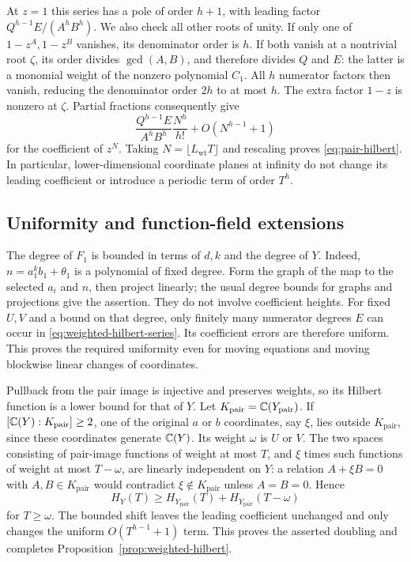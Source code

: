 At \(z=1\) this series has a pole of order \(h+1\), with leading
factor \(Q^{h-1}E/(A^hB^h)\).
We also check all other roots of unity.  If only one of
\(1-z^A,1-z^B\) vanishes, its denominator order is \(h\).
If both vanish at a nontrivial root \(\zeta\), its order divides
\(\gcd(A,B)\), and therefore divides \(Q\) and \(E\): the latter
is a monomial weight of the nonzero polynomial \(C_1\).
All \(h\) numerator factors then vanish, reducing the denominator
order \(2h\) to at most \(h\).  The extra factor \(1-z\) is
nonzero at \(\zeta\).
Partial fractions consequently give
\[
 \frac{Q^{h-1}E}{A^hB^h}\frac{N^h}{h!}
 +O(N^{h-1}+1)
\]
for the coefficient of \(z^N\).  Taking \(N=\lfloor L_{\mathrm{wt}}T\rfloor\)
and rescaling proves \eqref{eq:pair-hilbert}.
In particular, lower-dimensional coordinate planes at infinity
do not change its leading coefficient or introduce a periodic
term of order \(T^h\).

\subsection{Uniformity and function-field extensions}

The degree of \(F_1\) is bounded in terms of \(d,k\) and the degree
of \(Y\).  Indeed, \(n=a_1^kb_1+\theta_1\) is a polynomial of
fixed degree.  Form the graph of the map to the selected \(a_i\)
and \(n\), then project linearly; the usual degree bounds for
graphs and projections give the assertion.
They do not involve coefficient heights.  For fixed \(U,V\)
and a bound on that degree, only finitely many numerator degrees
\(E\) can occur in \eqref{eq:weighted-hilbert-series}.  Its
coefficient errors are therefore uniform.  This proves the
required uniformity even for moving equations and moving
blockwise linear changes of coordinates.

Pullback from the pair image is injective and preserves weights,
so its Hilbert function is a lower bound for that of \(Y\).
Let \(K_{\mathrm{pair}}=\mathbb C(Y_{\mathrm{pair}})\).
If \([\mathbb C(Y):K_{\mathrm{pair}}]\geq2\), one of the original \(a\) or \(b\)
coordinates, say \(\xi\), lies outside \(K_{\mathrm{pair}}\), since these
coordinates generate \(\mathbb C(Y)\).  Its weight \(\omega\) is
\(U\) or \(V\).  The two spaces consisting of pair-image
functions of weight at most \(T\), and \(\xi\) times such
functions of weight at most \(T-\omega\), are linearly
independent on \(Y\): a relation \(A+\xi B=0\) with
\(A,B\in K_{\mathrm{pair}}\) would contradict \(\xi\notin K_{\mathrm{pair}}\) unless
\(A=B=0\).  Hence
\begin{equation}
 H_Y(T)\geq
 H_{Y_{\mathrm{pair}}}(T)+H_{Y_{\mathrm{pair}}}(T-\omega)
 \label{eq:field-degree-gain}
\end{equation}
for \(T\geq\omega\).  The bounded shift leaves the leading
coefficient unchanged and only changes the uniform
\(O(T^{h-1}+1)\) term.  This proves the asserted doubling
and completes Proposition~\ref{prop:weighted-hilbert}.

